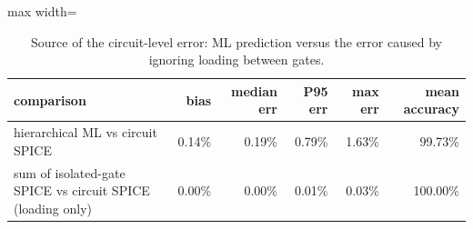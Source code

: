 \begin{table}[H]
\centering
{\small
\begin{adjustbox}{max width=\linewidth}
\begin{tabular}{lrrrrr}
\toprule
comparison & bias & median err & P95 err & max err & mean accuracy \\
\midrule
hierarchical ML vs circuit SPICE & 0.14\% & 0.19\% & 0.79\% & 1.63\% & 99.73\% \\
sum of isolated-gate SPICE vs circuit SPICE (loading only) & 0.00\% & 0.00\% & 0.01\% & 0.03\% & 100.00\% \\
\bottomrule
\end{tabular}
\end{adjustbox}
}
\caption{Source of the circuit-level error: ML prediction versus the error caused by ignoring loading between gates.}
\label{tab:cdecomp}
\end{table}

